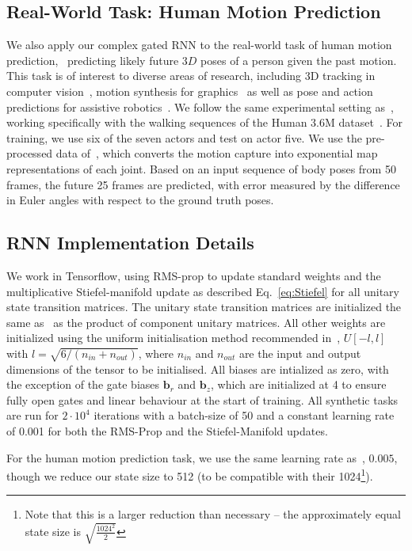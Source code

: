 \documentclass{article}
\begin{document}
\subsection{Real-World Task: Human Motion Prediction}
We also apply our complex gated RNN to the real-world task of human motion prediction, \ie~predicting likely future $3D$ poses of a person given the past motion.  This task is of interest to diverse areas of research, including 3D tracking in computer vision~\cite{sigal2010humaneva,yao2012coupled}, motion synthesis for graphics~\cite{kovar2002motion,safonova2007construction} as well as pose and action predictions for assistive robotics~\cite{koppula2016anticipating}.  We follow the same experimental setting as~\cite{martinez2017human}, working specifically with the walking sequences of the Human 3.6M dataset~\cite{h36m_pami}.  For training, we use six of the seven actors and test on actor five.  We use the pre-processed data of~\cite{NIPS2006_3078}, which converts the motion capture into exponential map representations of each joint.  Based on an input sequence of body poses from 50 frames, the future 25 frames are predicted, with error measured by the difference in Euler angles with respect to the ground truth poses.

\subsection{RNN Implementation Details}
We work in Tensorflow, using RMS-prop to update standard weights and the multiplicative Stiefel-manifold update as described  Eq.~\ref{eq:Stiefel} for all unitary state transition matrices.  The unitary state transition matrices are initialized the same as~\cite{Arjovsky} as the product of component unitary matrices. %
All other weights are initialized using the uniform initialisation method recommended in~\cite{glorot2010understanding}, \ie  $U[-l,l]$ with $l=\sqrt{6 / (n_{in} + n_{out})}$, where $n_{in}$ and $n_{out}$ are the input and output dimensions of the tensor to be initialised.  All biases are intialized as zero, with the exception of the gate biases $\bm{b}_r$ and $\bm{b}_z$, which are initialized at 4 to ensure fully open gates and linear behaviour at the start of training.  All synthetic tasks are run for $2\cdot 10^4$ iterations with a batch-size of 50 and a constant learning rate of 0.001 for both the RMS-Prop and the Stiefel-Manifold updates.

For the human motion prediction task, we use the same learning rate as~\cite{martinez2017human}, $0.005$, though we reduce our state size to 512 (to be compatible with their 1024\footnote{Note that this is a larger reduction than necessary -- the approximately equal state size is $\sqrt{\frac{1024^2}{2}}$}). 
\end{document}
